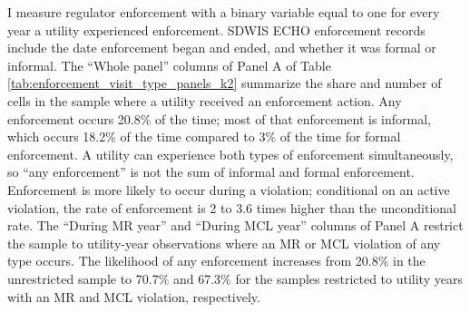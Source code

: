 \documentclass[12pt]{article}
\newcommand{\outputdir}{../../output}
\newcommand{\outsum}[1]{}
\begin{document}
I measure regulator enforcement with a binary variable equal to one for every year a utility experienced enforcement. SDWIS ECHO enforcement records include the date enforcement began and ended, and whether it was formal or informal. The ``Whole panel'' columns of Panel A of Table \ref{tab:enforcement_visit_type_panels_k2} summarize the share and number of cells in the sample where a utility received an enforcement action. Any enforcement occurs 20.8\% of the time; most of that enforcement is informal, which occurs 18.2\% of the time compared to 3\% of the time for formal enforcement. A utility can experience both types of enforcement simultaneously, so ``any enforcement'' is not the sum of informal and formal enforcement. Enforcement is more likely to occur during a violation; conditional on an active violation, the rate of enforcement is 2 to 3.6 times higher than the unconditional rate. The ``During MR year'' and ``During MCL year'' columns of Panel A restrict the sample to utility-year observations where an MR or MCL violation of any type occurs. The likelihood of any enforcement increases from 20.8\% in the unrestricted sample to 70.7\% and 67.3\% for the samples restricted to utility years with an MR and MCL violation, respectively.  



\end{document}
